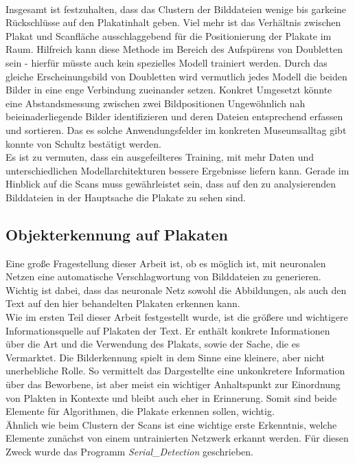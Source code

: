 \documentclass[a4paper,12pt,ngerman]{article}
\begin{document}
\\
Insgesamt ist festzuhalten, dass das Clustern der Bilddateien wenige bis garkeine Rückschlüsse auf den Plakatinhalt geben. Viel mehr ist das Verhältnis zwischen Plakat und Scanfläche ausschlaggebend für die Positionierung der Plakate im Raum. Hilfreich kann diese Methode im Bereich des Aufspürens von Doubletten sein - hierfür müsste auch kein spezielles Modell trainiert werden. Durch das gleiche Erscheinungsbild von Doubletten wird vermutlich jedes Modell die beiden Bilder in eine enge Verbindung zueinander setzen. Konkret Umgesetzt könnte eine Abstandsmessung zwischen zwei Bildpositionen Ungewöhnlich nah beieinaderliegende Bilder identifizieren und deren Dateien entsprechend erfassen und sortieren. Das es solche Anwendungsfelder im konkreten Museumsalltag gibt konnte von Schultz bestätigt werden. \\
Es ist zu vermuten, dass ein ausgefeilteres Training, mit mehr Daten und unterschiedlichen Modellarchitekturen bessere Ergebnisse liefern kann. Gerade im Hinblick auf die Scans muss gewährleistet sein, dass auf den zu analysierenden Bilddateien in der Hauptsache die Plakate zu sehen sind. \\

\subsection{Objekterkennung auf Plakaten}

Eine große Fragestellung dieser Arbeit ist, ob es möglich ist, mit neuronalen Netzen eine automatische Verschlagwortung von Bilddateien zu generieren. Wichtig ist dabei, dass das neuronale Netz sowohl die Abbildungen, als auch den Text auf den hier behandelten Plakaten erkennen kann. \\
Wie im ersten Teil dieser Arbeit festgestellt wurde, ist die größere und wichtigere Informationsquelle auf Plakaten der Text. Er enthält konkrete Informationen über die Art und die Verwendung des Plakats, sowie der Sache, die es Vermarktet. Die Bilderkennung spielt in dem Sinne eine kleinere, aber nicht unerhebliche Rolle. So vermittelt das Dargestellte eine unkonkretere Information über das Beworbene, ist aber meist ein wichtiger Anhaltspunkt zur Einordnung von Plakten in Kontexte und bleibt auch eher in Erinnerung. Somit sind beide Elemente für Algorithmen, die Plakate erkennen sollen, wichtig. \\

Ähnlich wie beim Clustern der Scans ist eine wichtige erste Erkenntnis, welche Elemente zunächst von einem untrainierten Netzwerk erkannt werden. Für diesen Zweck wurde das Programm \textit{Serial\_Detection} geschrieben. \\
\end{document}
